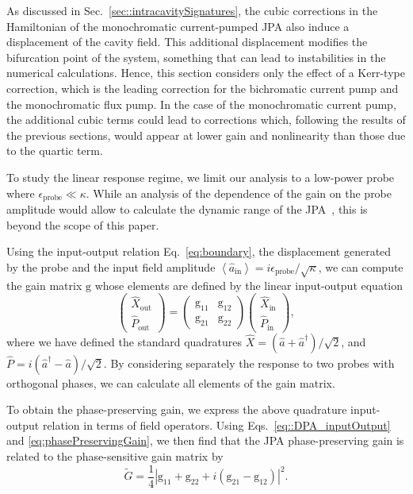 \documentclass[pra,twocolumn,superscriptaddress]{revtex4-1}
\newcommand{\ah}[0]{\hat{a}}
\newcommand{\ain}[0]{\hat{a}_{\mathrm{in}}}
\newcommand{\parO}[1]{\left(#1\right)}
\newcommand{\matO}[1]{\parO{\begin{matrix}#1\end{matrix}}}
\newcommand{\abs}[1]{\left|#1\right|}
\newcommand{\average}[1]{\left\langle #1\right\rangle}
\newcommand{\Grm}[0]{\mathrm{g}}
\begin{document}
As discussed in Sec.~\ref{sec::intracavitySignatures}, the cubic corrections in the Hamiltonian of the monochromatic current-pumped JPA also induce a displacement of the cavity field.
This additional displacement modifies the bifurcation point of the system, something that can lead to instabilities in the numerical calculations. 
Hence, this section considers only the effect of a Kerr-type correction, which is the leading correction for the bichromatic current pump and the monochromatic flux pump. In the case of the monochromatic current pump, the additional cubic terms could lead to corrections which, following the results of the previous sections, would appear at lower gain and nonlinearity than those due to the quartic term.

To study the linear response regime, we limit our analysis to a low-power probe where $\epsilon_{\mathrm{probe}} \ll \kappa$.
While an analysis of the dependence of the gain on the probe amplitude would allow to calculate the dynamic range of the JPA~\cite{Eichler:2013fk,Kochetov:2015ab}, this is beyond the scope of this paper. 


Using the input-output relation Eq.~\eqref{eq:boundary}, the displacement generated by the probe and the input field amplitude
	$\average{\ain} = {i \epsilon_{\mathrm{probe} }}/{\sqrt{\kappa}}$,
we can compute the gain matrix $\Grm$ whose elements are defined by the linear input-output equation
% 
\begin{equation}
	\matO{\hat X_{\mathrm{out}} \\ \hat P_{\mathrm{out}}}
	=
	\matO{\Grm_{11} & \Grm_{12} \\ \Grm_{21}& \Grm_{22}}
	\matO{\hat X_{\mathrm{in}} \\ \hat P_{\mathrm{in}}},
	\label{eq:quadratureLinearInputOutput}
\end{equation}
where we have defined the standard quadratures
	$\hat X =  \parO{\ah+\ah^\dag}/\sqrt{2}$,
	and
	$\hat P =  i\parO{\ah^\dag-\ah}/\sqrt{2}$.
By considering separately the response to two probes with orthogonal phases, we can calculate all elements of the gain matrix.
% 

To obtain the phase-preserving gain, we express the above quadrature input-output relation in terms of field operators. Using Eqs.~\eqref{eq::DPA_inputOutput} and \eqref{eq:phasePreservingGain}, we then find that the JPA phase-preserving gain is related to the phase-sensitive gain matrix by
\begin{equation}
 	\tilde{G}
 	= 
 	\frac{1}{4}\abs{\Grm_{11}+ \Grm_{22}+ i \parO{\Grm_{21}-\Grm_{12} }}^2.
 	\label{eq:gainPP}
 \end{equation} 
\end{document}
